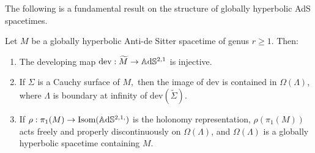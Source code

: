 The following is a fundamental result on the structure of globally hyperbolic AdS spacetimes.

\begin{proposition}\label{holorep}
    Let $M$ be a globally hyperbolic Anti-de Sitter spacetime of genus $r\geq 1$. Then: 
    \begin{enumerate}
        \item The developing map $\text{dev}:\widetilde{M}  \to  \mathbb{A}\mathrm{d}\mathbb{S}^{2,1}$ is injective.
        \item If $\Sigma$ is a Cauchy surface of $M,$ then the image of dev is contained in $\Omega(\Lambda)$, where $\Lambda$ is boundary at infinity of $\text{dev}(\widetilde{\Sigma}).$
        \item If $\rho:\pi_1(M)\to\text{Isom}(\mathbb{A}\mathrm{d}\mathbb{S}^{2,1,})$ is the holonomy representation, $\rho(\pi_1(M))$ acts freely and properly discontinuously on $\Omega(\Lambda)$, and $\Omega(\Lambda)$ is a globally hyperbolic spacetime containing $M$. 
    \end{enumerate}
\end{proposition}
